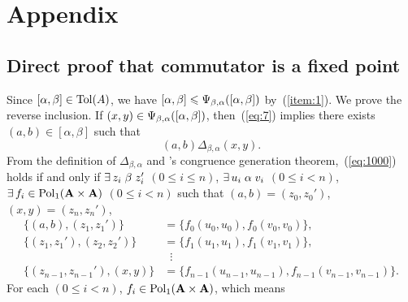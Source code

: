 














\appendix
\section{Appendix}
\subsection{Direct proof that commutator is a fixed point}

  Since $[\alpha, \beta] \in \operatorname{Tol}(A)$,
  we have $[\alpha, \beta] \leqslant \Psi_{\beta, \alpha}([\alpha, \beta])$
  by~(\ref{item:1}).
  We prove the reverse inclusion.
  If $(x,y)\in \Psi_{\beta, \alpha}([\alpha, \beta])$, then~(\ref{eq:7})
  implies there exists $(a,b)\in [\alpha, \beta]$ such that
    \begin{equation}
      \label{eq:1000}
     (a,b) \mathrel{\Delta_{\beta, \alpha}} (x,y).
    \end{equation}
    From the definition of $\Delta_{\beta, \alpha}$ and 
    \malcev's congruence generation theorem,~(\ref{eq:1000})
    holds if and only if
    $\exists \, z_i \mathrel{\beta} z_i'$ $(0\leq i \leq n)$,
    $\exists \, u_i \mathrel{\alpha} v_i$ $(0\leq i < n)$,
    $\exists\, f_i \in \operatorname{Pol}_1(\mathbf{A}\times \mathbf{A})$ $(0\leq i < n)$
    such that
    $(a, b) = (z_0,z_0')$,
    $(x, y)=(z_n,z_n')$,
    \begin{align}
      \label{eq:0}
      \{(a, b),(z_1,z_1')\} &= \{f_0(u_0,u_0), f_0(v_0,v_0)\},\\
      \label{eq:1}
      \{(z_1,z_1'),(z_2,z_2')\} &= \{f_1(u_1,u_1), f_1(v_1,v_1)\},\\
      \nonumber
      &\; \; \vdots\\
      \nonumber
      \{(z_{n-1},z_{n-1}'),(x, y)\} &= \{f_{n-1}(u_{n-1},u_{n-1}), f_{n-1}(v_{n-1},v_{n-1})\}.
    \end{align}
    For each $(0\leq i < n)$, $f_i \in \operatorname{Pol}_1(\mathbf{A}\times \mathbf{A})$, which means
    \newcommand\gA{\ensuremath{g^{\bA}}}%
